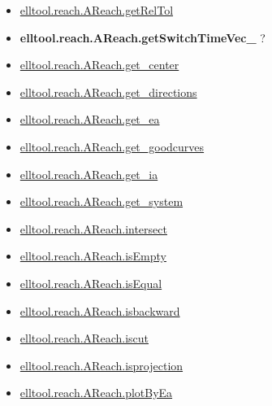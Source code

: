 \documentclass[letterpaper,10pt,english]{sphinxmanual}
\begin{document}
\begin{itemize}
\item {} 
{\hyperref[chap_func:elltool-reach-areach-getreltol]{elltool.reach.AReach.getRelTol}}

\item {} 
{\color{red}\bfseries{}elltool.reach.AReach.getSwitchTimeVec\_} ?

\item {} 
{\hyperref[chap_func:elltool-reach-areach-get-center]{elltool.reach.AReach.get\_center}}

\item {} 
{\hyperref[chap_func:elltool-reach-areach-get-directions]{elltool.reach.AReach.get\_directions}}

\item {} 
{\hyperref[chap_func:elltool-reach-areach-get-ea]{elltool.reach.AReach.get\_ea}}

\item {} 
{\hyperref[chap_func:elltool-reach-areach-get-goodcurves]{elltool.reach.AReach.get\_goodcurves}}

\item {} 
{\hyperref[chap_func:elltool-reach-areach-get-ia]{elltool.reach.AReach.get\_ia}}

\item {} 
{\hyperref[chap_func:elltool-reach-areach-get-system]{elltool.reach.AReach.get\_system}}

\item {} 
{\hyperref[chap_func:elltool-reach-areach-intersect]{elltool.reach.AReach.intersect}}

\item {} 
{\hyperref[chap_func:elltool-reach-areach-isempty]{elltool.reach.AReach.isEmpty}}

\item {} 
{\hyperref[chap_func:elltool-reach-areach-isequal]{elltool.reach.AReach.isEqual}}

\item {} 
{\hyperref[chap_func:elltool-reach-areach-isbackward]{elltool.reach.AReach.isbackward}}

\item {} 
{\hyperref[chap_func:elltool-reach-areach-iscut]{elltool.reach.AReach.iscut}}

\item {} 
{\hyperref[chap_func:elltool-reach-areach-isprojection]{elltool.reach.AReach.isprojection}}

\item {} 
{\hyperref[chap_func:elltool-reach-areach-plotbyea]{elltool.reach.AReach.plotByEa}}


\end{itemize}
\end{document}
